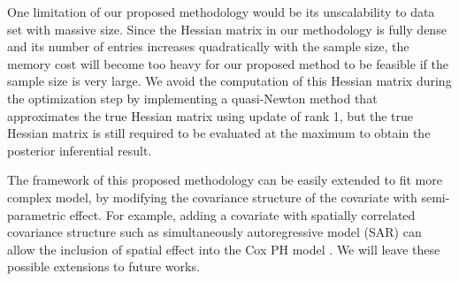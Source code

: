 \documentclass[]{article}
\begin{document}
One limitation of our proposed methodology would be its unscalability to data set with massive size. Since the Hessian matrix in our methodology is fully dense and its number of entries increases quadratically with the sample size, the memory cost will become too heavy for our proposed method to be feasible if the sample size is very large. We avoid the computation of this Hessian matrix during the optimization step by implementing a quasi-Newton method that approximates the true Hessian matrix using update of rank 1, but the true Hessian matrix is still required to be evaluated at the maximum to obtain the posterior inferential result. 

The framework of this proposed methodology can be easily extended to fit more complex model, by modifying the covariance structure of the covariate with semi-parametric effect. For example, adding a covariate with spatially correlated covariance structure such as simultaneously autoregressive model (SAR) can allow the inclusion of spatial effect into the Cox PH model \citep{Spatial}. We will leave these possible extensions to future works.

\newpage



\end{document}
